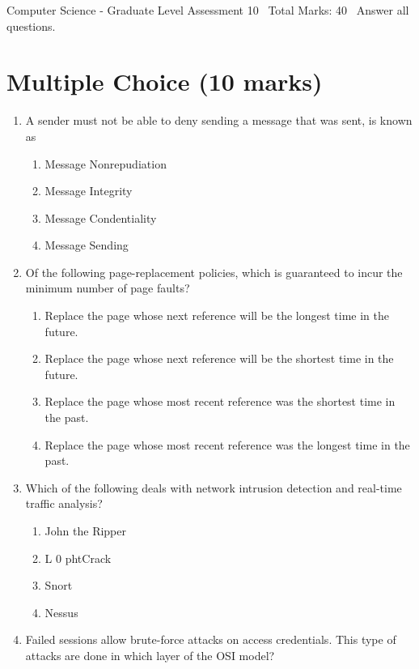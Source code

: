 \documentclass[12pt]{article}
\begin{document}
\begin{center}
Computer Science - Graduate Level Assessment 10 \
Total Marks: 40 \
Answer all questions.
\end{center}

\section*{Multiple Choice (10 marks)}
\begin{enumerate}[label=\arabic*.]
\item A sender must not be able to deny sending a message that was sent, is known as
\begin{enumerate}[label=(\alph*)]
    \item Message Nonrepudiation
    \item Message Integrity
    \item Message Condentiality
    \item Message Sending
\end{enumerate}
\item Of the following page-replacement policies, which is guaranteed to incur the minimum number of page faults?
\begin{enumerate}[label=(\alph*)]
    \item Replace the page whose next reference will be the longest time in the future.
    \item Replace the page whose next reference will be the shortest time in the future.
    \item Replace the page whose most recent reference was the shortest time in the past.
    \item Replace the page whose most recent reference was the longest time in the past.
\end{enumerate}
\item Which of the following deals with network intrusion detection and real-time traffic analysis?
\begin{enumerate}[label=(\alph*)]
    \item John the Ripper
    \item L 0 phtCrack
    \item Snort
    \item Nessus
\end{enumerate}
\item Failed sessions allow brute-force attacks on access credentials. This type of attacks are done in which layer of the OSI model?
\begin{enumerate}[label=(\alph*)]

\end{enumerate}
\end{enumerate}
\end{document}
